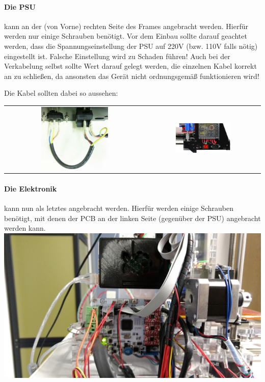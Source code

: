 \paragraph{Die PSU} kann an der (von Vorne) rechten Seite des Frames angebracht werden. Hierfür werden nur einige Schrauben benötigt. Vor dem Einbau sollte darauf geachtet werden, dass die Spannungseinstellung der PSU auf 220V (bzw. 110V falls nötig) eingestellt ist. Falsche Einstellung wird zu Schaden führen! Auch bei der Verkabelung selbst sollte Wert darauf gelegt werden, die einzelnen Kabel korrekt an zu schließen, da ansonsten das Gerät nicht ordnungsgemäß funktionieren wird! 

Die Kabel sollten dabei so aussehen:\\
\begin{tabular}{cc}
\includegraphics[width=0.5\textwidth]{Bilder/Power_1.jpg} &
\includegraphics[clip=true, trim=140 0 100 0, width=0.5\textwidth]{Bilder/Power_2.jpg} \\
\end{tabular}

\paragraph{Die Elektronik} kann nun als letztes angebracht werden. Hierfür werden einige Schrauben benötigt, mit denen der PCB an der linken Seite (gegenüber der PSU) angebracht werden kann.\\
\includegraphics[width=\textwidth]{Bilder/Tutorial/IMG_20161101_143146715.jpg}\\

